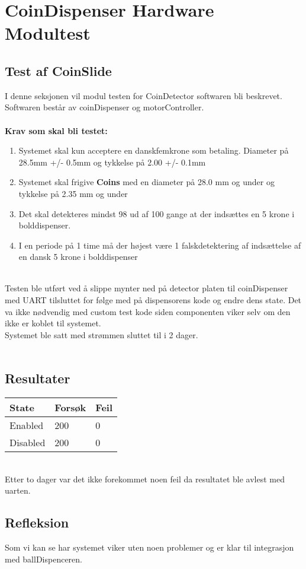 \documentclass[Modultest/Modultest_main.tex]{subfiles}
\begin{document}
\section{CoinDispenser Hardware Modultest}

\subsection{Test af CoinSlide}
I denne seksjonen vil modul testen for CoinDetector softwaren bli beskrevet. Softwaren består av coinDispenser og motorController.\\

\\

\textbf{Krav som skal bli testet:}
\begin{enumerate}
    \item Systemet skal kun acceptere en danskfemkrone som betaling. Diameter på 28.5mm +/- 0.5mm og tykkelse på 2.00 +/- 0.1mm
    \item Systemet skal frigive \textbf{Coins} med en diameter på 28.0 mm og under og tykkelse på 2.35 mm og under
    \item Det skal detekteres mindst 98 ud af 100 gange at der indsættes en 5 krone i bolddispenser.
    \item I en periode på 1 time må der højest være 1 falskdetektering af indsættelse af en dansk 5 krone i bolddispenser
\end{enumerate}

\\
Testen ble utført ved å slippe mynter ned på detector platen til coinDispenser med UART tilsluttet for følge med på dispensorens kode og endre dens state. Det va ikke nødvendig med custom test kode siden componenten viker selv om den ikke er koblet til systemet.\\
Systemet ble satt med strømmen sluttet til i 2 dager. \\
\\

\subsection{Resultater}
\begin{table}[H]
\Large
\centering
\begin{tabular}{|l|l|l|}
\hline

\textbf{State} & \textbf{Forsøk} & \textbf{Feil} \\ \hline
Enabled         & 200             & 0             \\ \hline
Disabled         & 200             & 0             \\ \hline

\end{tabular}
\end{table}
\\
Etter to dager var det ikke forekommet noen feil da resultatet ble avlest med uarten. 
\subsection{Refleksion}

Som vi kan se har systemet viker uten noen problemer og er klar til integrasjon med ballDispenceren. 
\end{document}
